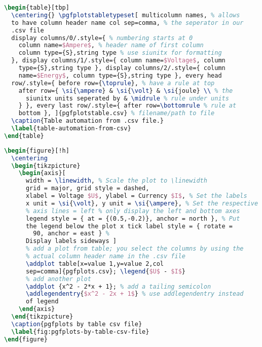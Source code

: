 \begin{appendices}
\begin{minipage}[tbp]{1.0\linewidth}
\begin{lstlisting}[language=TeX,caption={pgfplotstable
template},label={lst:pgfplotstable-template},basicstyle=\scriptsize\ttfamily,linewidth=\textwidth]
\begin{table}[tbp]
  \centering{} \pgfplotstabletypeset[ multicolumn names, % allows
  to have column header name col sep=comma, % the seperator in our
  .csv file
  display columns/0/.style={ % numbering starts at 0
    column name=$Ampere$, % header name of first column
    column type={S},string type % use siunitx for formatting
  }, display columns/1/.style={ column name=$Voltage$, column
    type={S},string type }, display columns/2/.style={ column
    name=$Energy$, column type={S},string type }, every head
  row/.style={ before row={\toprule}, % have a rule at top
    after row={ \si{\ampere} & \si{\volt} & \si{joule} \\ % the
      siunitx units seperated by & \midrule % rule under units
    } }, every last row/.style={ after row=\bottomrule % rule at
    bottom }, ]{pgfplotstable.csv} % filename/path to file
  \caption{Table automation from .csv file.}
  \label{table-automation-from-csv}
\end{table}
\end{lstlisting}    
\end{minipage}

\begin{minipage}[tbp]{1.0\linewidth}
\begin{lstlisting}[language=TeX,caption={pgfplots
template},label={lst:pgfplots-template},basicstyle=\tiny\ttfamily,linewidth=\textwidth]
\begin{figure}[!h]
  \centering
  \begin{tikzpicture}
    \begin{axis}[
      width = \linewidth, % Scale the plot to \linewidth
      grid = major, grid style = dashed,
      xlabel = Voltage $U$, ylabel = Currency $I$, % Set the labels
      x unit = \si{\volt}, y unit = \si{\ampere}, % Set the respective units
      % axis lines = left % only display the left and bottom axes
      legend style = { at = {(0.5,-0.2)}, anchor = north }, % Put
      the legend below the plot x tick label style = { rotate =
        90, anchor = east } %
      Display labels sideways ]
      % add a plot from table; you select the columns by using the
      % actual column header name in the .csv file
      \addplot table[x=value 1,y=value 2,col
      sep=comma]{pgfplots.csv}; \legend{$U$ - $I$}
      % add another plot
      \addplot {x^2 - 2*x + 1}; % add a tailing semicolon
      \addlegendentry{$x^2 - 2x + 1$} % use addlegendentry instead
      of legend
    \end{axis}
  \end{tikzpicture}
  \caption{pgfplots by table csv file}
  \label{fig:pgfplots-by-table-csv-file}
\end{figure}
\end{lstlisting}
\end{minipage}


\end{appendices}
